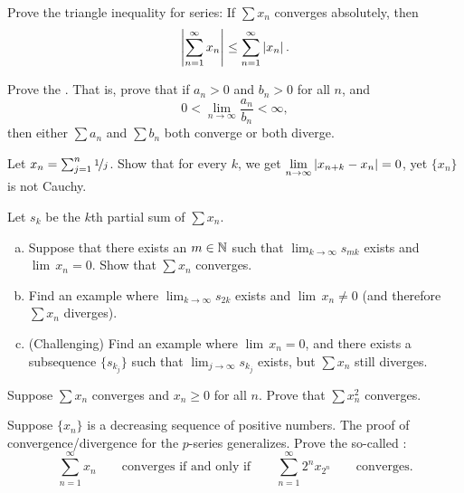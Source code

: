 \begin{exercise}
Prove the triangle inequality for series:
If $\sum x_n$ converges absolutely, then
\begin{equation*}
\left\lvert {\sum_{n=1}^\infty x_n} \right\rvert \leq
\sum_{n=1}^\infty \left\lvert {x_n} \right\rvert .
\end{equation*}
\end{exercise}

\begin{exercise}
Prove the \emph{}.  That is, prove that if
$a_n > 0$ and $b_n > 0$ for all $n$, and
\begin{equation*}
0 < \lim_{n\to\infty} \frac{a_n}{b_n} < \infty ,
\end{equation*}
then either $\sum a_n$ and $\sum b_n$ both converge or both diverge.
\end{exercise}

\begin{exercise} \label{exercise:badnocauchy}
Let $x_n = \sum_{j=1}^n \nicefrac{1}{j}$.  Show that for every $k$,
we get
$\displaystyle \lim_{n\to\infty} \left\lvert {x_{n+k}-x_n} \right\rvert = 0$, yet $\{ x_n \}$ is not Cauchy.
\end{exercise}

\begin{samepage}
\begin{exercise}
Let $s_k$ be the $k$th partial sum of $\sum x_n$.
\begin{enumerate}[a)]
\item
Suppose that there exists an $m \in {\mathbb{N}}$ such that $\displaystyle \lim_{k\to\infty}
s_{mk}$ exists and $\lim\, x_n = 0$.  Show that $\sum x_n$ converges.
\item
Find an example where $\displaystyle \lim_{k\to\infty} s_{2k}$ exists and
$\lim\, x_n \not= 0$ (and therefore $\sum x_n$ diverges).
\item
(Challenging) Find an example where $\lim\, x_n = 0$, and there exists
a subsequence $\{ s_{k_j} \}$ such that $\displaystyle \lim_{j\to\infty} s_{k_j}$ exists,
but $\sum x_n$ still diverges.
\end{enumerate}
\end{exercise}
\end{samepage}

\begin{exercise} \label{exercise:squareseriesconv}
Suppose $\sum x_n$ converges and $x_n \geq 0$ for all $n$.  Prove that $\sum x_n^2$ converges.
\end{exercise}

\begin{exercise}[Challenging] \label{exercise:cauchycondensation}
Suppose $\{ x_n\}$ is a decreasing sequence of positive numbers.
The proof of convergence/divergence for the $p$-series generalizes.
Prove the so-called 
\emph{}:
\begin{equation*}
\sum_{n=1}^\infty x_n
\qquad \text{converges if and only if} \qquad
\sum_{n=1}^\infty 2^n x_{2^n} \qquad \text{converges}.
\end{equation*}
\end{exercise}

